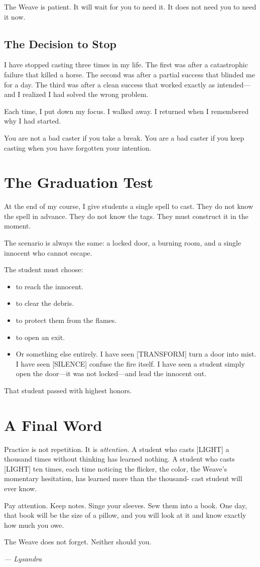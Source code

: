 The Weave is patient. It will wait for you to need it. It does not need you to need it now.

\subsection{The Decision to Stop}

I have stopped casting three times in my life. The first was after a catastrophic failure that killed a horse. The second was after a partial success that blinded me for a day. The third was after a clean success that worked exactly as intended---and I realized I had solved the wrong problem.

Each time, I put down my focus. I walked away. I returned when I remembered why I had started.

You are not a bad caster if you take a break. You are a bad caster if you keep casting when you have forgotten your intention.

\section{The Graduation Test}

At the end of my course, I give students a single spell to cast. They do not know the spell in advance. They do not know the tags. They must construct it in the moment.

The scenario is always the same: a locked door, a burning room, and a single innocent who cannot escape.

The student must choose:

\begin{itemize}
    \item [LEAP] to reach the innocent.
    \item [BURNING] to clear the debris.
    \item [WARD] to protect them from the flames.
    \item [GATE] to open an exit.
    \item Or something else entirely. I have seen [TRANSFORM] turn a door into mist. I have seen [SILENCE] confuse the fire itself. I have seen a student simply open the door---it was not locked---and lead the innocent out.
\end{itemize}

That student passed with highest honors.

\section{A Final Word}

Practice is not repetition. It is \emph{attention}. A student who casts [LIGHT] a thousand times without thinking has learned nothing. A student who casts [LIGHT] ten times, each time noticing the flicker, the color, the Weave's momentary hesitation, has learned more than the thousand- cast student will ever know.

Pay attention. Keep notes. Singe your sleeves. Sew them into a book. One day, that book will be the size of a pillow, and you will look at it and know exactly how much you owe.

The Weave does not forget. Neither should you.

\textit{--- Lysandra}
